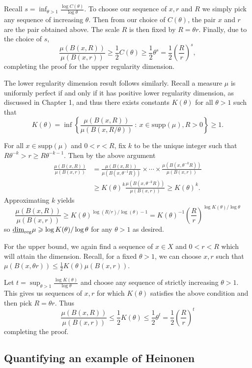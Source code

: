 Recall $s = \inf_{\theta > 1}\frac{\log C(\theta)}{\log \theta}$. To choose our sequence of $x,r$ and $R$ we simply pick any sequence of increasing $\theta$. Then from our choice of $C(\theta)$, the pair $x$ and $r$ are the pair obtained above. The scale $R$ is then fixed by $R = \theta r$. Finally, due to the choice of $s$,
\[
\frac{\mu(B(x,R))}{\mu(B(x,r))} \ge \frac{1}{2} C(\theta)  \ge \frac{1}{2}\theta^s = \frac{1}{2}\left(\frac{R}{r} \right)^s,
\]
completing the proof for the upper regularity dimension.
	
The lower regularity dimension result follows similarly. Recall a measure $\mu$ is uniformly perfect if and only if it has positive lower regularity dimension, as discussed in Chapter 1, and thus there exists constants $K(\theta)$ for all $\theta > 1$ such that 
\[
K(\theta) =  \inf \left\{ \frac{\mu(B(x,R))}{\mu(B(x,R/\theta))} \ : \ x \in \text{supp}(\mu), R>0 \right\} \geq 1.
\]

For all $x \in \text{supp}(\mu)$ and $0<r<R$, fix $k$ to be the unique integer such that $R \theta^{-k} > r \ge R \theta^{-k-1}$. Then by the above argument
\begin{align*}
\frac{\mu(B(x,R))}{\mu(B(x,r))} &= \frac{\mu(B(x,R))}{\mu(B(x,\theta^{-1}R))} \times \cdots \times \frac{\mu(B(x,\theta^{-k}R))}{\mu(B(x,r))} \\
&\ge K(\theta)^k \frac{\mu(B(x,\theta^{-k}R))}{\mu(B(x,r))} \ge K(\theta)^k.
\end{align*}
Approximating $k$ yields
\[
\frac{\mu(B(x,R))}{\mu(B(x,r))} \ge K(\theta)^{\log(R/r)/\log(\theta) - 1} = K(\theta)^{-1} \left(\frac{R}{r}\right)^{\log K(\theta)/ \log \theta}
\]
so $\underline{\dim}_{\textup{reg}} \mu \geqslant \log K(\theta) / \log \theta$ for any $\theta > 1$ as desired. 

For the upper bound, we again find a sequence of $x\in X$ and $0<r<R$ which will attain the dimension. Recall, for a fixed $\theta > 1$, we can choose $x,r$ such that $\mu(B(x,\theta r)) \le \frac{1}{2}K(\theta)\mu(B(x,r))$. 

Let $t = \sup_{\theta > 1} \frac{\log K(\theta)}{\log \theta}$ and choose any sequence of strictly increasing $\theta > 1$. This gives us sequences of $x,r$ for which $K(\theta)$ satisfies the above condition and then pick $R = \theta r$. Thus
\[
\frac{\mu(B(x,R))}{\mu(B(x,r))} \le \frac{1}{2} K(\theta) \le \frac{1}{2} \theta^t = \frac{1}{2} \left(\frac{R}{r} \right)^t
\]
completing the proof.



\subsection{Quantifying an example of Heinonen}\label{ch-quantifying:sec:proof-heinonen}




